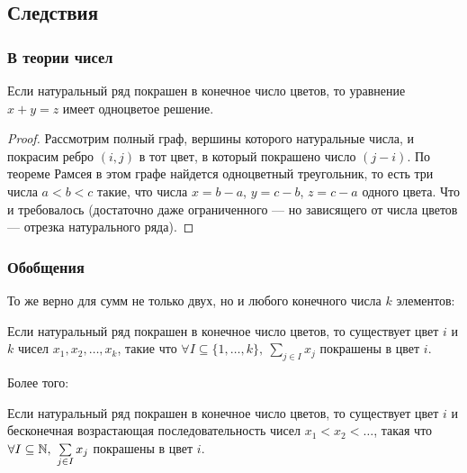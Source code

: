 \begin{normalsize}

\subsection{Следствия}

\subsubsection*{В теории чисел}

\begin{theorem} [Шур, 1917]

    Если натуральный ряд покрашен в конечное число цветов, то уравнение $x + y = z$ имеет одноцветое решение.

\end{theorem}

\begin{proof}
    Рассмотрим полный граф, вершины которого натуральные числа, и покрасим ребро $(i, j)$ в тот цвет, в который покрашено число $(j - i)$. По теореме Рамсея в этом графе найдется одноцветный треугольник, то есть три числа $a < b < c$ такие, что числа $x = b - a$, $y = c - b$, $z = c - a$ одного цвета. Что и требовалось (достаточно даже ограниченного --- но зависящего от числа цветов --- отрезка натурального ряда).
\end{proof}

\subsubsection*{Обобщения}

То же верно для сумм не только двух, но и любого конечного числа $k$ элементов:

\begin{theorem}
    
    Если натуральный ряд покрашен в конечное число цветов, то существует цвет $i$ и $k$ чисел $x_1, x_2, \ldots, x_k$, такие что $\forall I \subseteq \{1, \ldots, k\},~\sum\limits_{j \in I} x_j$ покрашены в цвет $i$.
    
\end{theorem}

Более того:

\begin{theorem} [Hindman, 1974]
    
    Если натуральный ряд покрашен в конечное число цветов, то существует цвет $i$ и бесконечная возрастающая последовательность чисел $x_1 < x_2 < \ldots$, такая что $\forall I \subseteq \mathbb{N},~\sum\limits_{j \in I} x_j$ покрашены в цвет $i$.


\end{theorem}
\end{normalsize}
